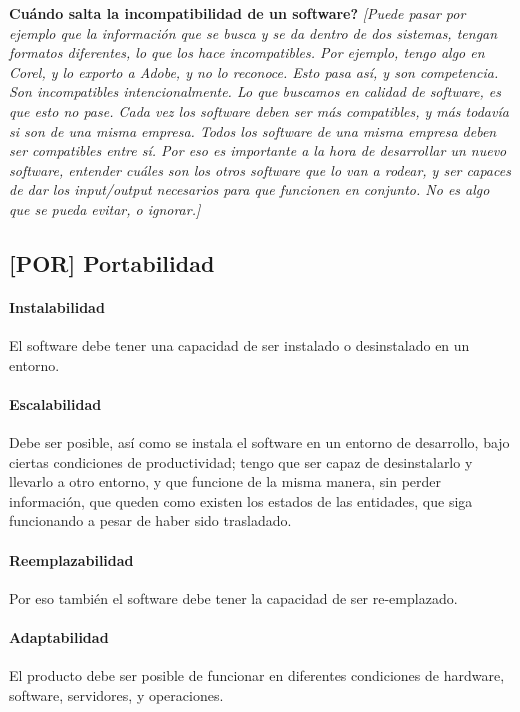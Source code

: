 \textbf{Cuándo salta la incompatibilidad de un software?}
{%
\slshape
[Puede pasar por ejemplo que la información que se busca y se da dentro de dos
sistemas, tengan formatos diferentes, lo que los hace incompatibles. Por
ejemplo, tengo algo en Corel, y lo exporto a Adobe, y no lo reconoce.
Esto pasa así, y son competencia. Son incompatibles intencionalmente. Lo
que buscamos en calidad de software, es que esto no pase. Cada vez los
software deben ser más compatibles, y más todavía si son de una misma
empresa. Todos los software de una misma empresa deben ser compatibles
entre sí. Por eso es importante a la hora de desarrollar un nuevo
software, entender cuáles son los otros software que lo van a rodear, y
ser capaces de dar los input/output necesarios para que funcionen en
conjunto. No es algo que se pueda evitar, o ignorar.]
}%

\hypertarget{portabilidad-por}{%
\subsection{%
{[}POR{]}
Portabilidad
}\label{portabilidad-por}}

\paragraph{Instalabilidad}
El software debe tener una capacidad de ser instalado o desinstalado en
un entorno.
\paragraph{Escalabilidad}
Debe ser posible, así como se instala el software en un
entorno de desarrollo, bajo ciertas condiciones de productividad; tengo
que ser capaz de desinstalarlo y llevarlo a otro entorno, y que funcione
de la misma manera, sin perder información, que queden como existen los
estados de las entidades, que siga funcionando a pesar de haber sido
trasladado.

\paragraph{Reemplazabilidad} Por eso también el software debe tener la capacidad de ser re-emplazado.

\hypertarget{adaptabilidad}{%
\paragraph{Adaptabilidad}\label{adaptabilidad}}
El producto debe ser posible de funcionar en
diferentes condiciones de hardware, software, servidores, y operaciones.

